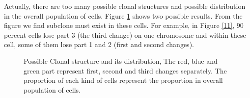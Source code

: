 \documentclass[a4paper]{article}
\begin{document}
Actually, there are too many possible clonal structures and possible distribution in the overall population of cells. Figure \ref{clonal} shows two possible results. From the figure we find subclone must exist in these cells. For example, in Figure \ref{11}, 90 percent cells lose part 3 (the third change) on one chromosome and within these cell, some of them lose part 1 and 2 (first and second changes).
\begin{figure}[h]
	\centering
	\caption{Possible Clonal structure and its distribution, The red, blue and green part represent first, second and third changes separately. The proportion of each kind of cells represent the proportion in overall population of cells.}
	\label{clonal} 
\end{figure}


%
%
\end{document}
